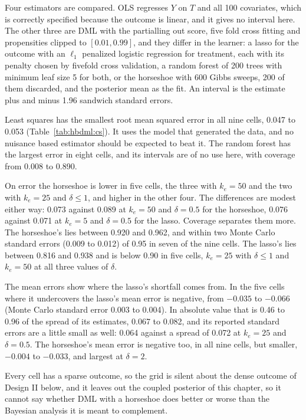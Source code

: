 Four estimators are compared. OLS regresses $Y$ on $T$ and all 100 covariates, which is correctly specified because the outcome is linear, and it gives no interval here. The other three are DML with the partialling out score, five fold cross fitting and propensities clipped to $[0.01, 0.99]$, and they differ in the learner: a lasso for the outcome with an $\ell_1$ penalized logistic regression for treatment, each with its penalty chosen by fivefold cross validation, a random forest of 200 trees with minimum leaf size 5 for both, or the horseshoe with 600 Gibbs sweeps, 200 of them discarded, and the posterior mean as the fit. An interval is the estimate plus and minus 1.96 sandwich standard errors.



Least squares has the smallest root mean squared error in all nine cells, 0.047 to 0.053 (Table~\ref{tab:hbdml:cs}). It uses the model that generated the data, and no nuisance based estimator should be expected to beat it. The random forest has the largest error in eight cells, and its intervals are of no use here, with coverage from 0.008 to 0.890.

On error the horseshoe is lower in five cells, the three with $k_e = 50$ and the two with $k_e = 25$ and $\delta \leq 1$, and higher in the other four. The differences are modest either way: 0.073 against 0.089 at $k_e = 50$ and $\delta = 0.5$ for the horseshoe, 0.076 against 0.071 at $k_e = 5$ and $\delta = 0.5$ for the lasso. Coverage separates them more. The horseshoe's lies between 0.920 and 0.962, and within two Monte Carlo standard errors (0.009 to 0.012) of 0.95 in seven of the nine cells. The lasso's lies between 0.816 and 0.938 and is below 0.90 in five cells, $k_e = 25$ with $\delta \leq 1$ and $k_e = 50$ at all three values of $\delta$.

The mean errors show where the lasso's shortfall comes from. In the five cells where it undercovers the lasso's mean error is negative, from $-0.035$ to $-0.066$ (Monte Carlo standard error 0.003 to 0.004). In absolute value that is 0.46 to 0.96 of the spread of its estimates, 0.067 to 0.082, and its reported standard errors are a little small as well: 0.064 against a spread of 0.072 at $k_e = 25$ and $\delta = 0.5$. The horseshoe's mean error is negative too, in all nine cells, but smaller, $-0.004$ to $-0.033$, and largest at $\delta = 2$.

 Every cell has a sparse outcome, so the grid is silent about the dense outcome of Design II below, and it leaves out the coupled posterior of this chapter, so it cannot say whether DML with a horseshoe does better or worse than the Bayesian analysis it is meant to complement.

